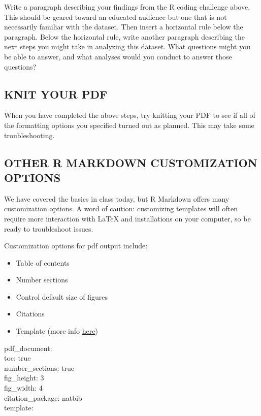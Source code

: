\documentclass[
]{article}
\providecommand{\tightlist}{%
  \setlength{\itemsep}{0pt}\setlength{\parskip}{0pt}}
\begin{document}
Write a paragraph describing your findings from the R coding challenge
above. This should be geared toward an educated audience but one that is
not necessarily familiar with the dataset. Then insert a horizontal rule
below the paragraph. Below the horizontal rule, write another paragraph
describing the next steps you might take in analyzing this dataset. What
questions might you be able to answer, and what analyses would you
conduct to answer those questions?

\hypertarget{knit-your-pdf}{%
\subsection{KNIT YOUR PDF}\label{knit-your-pdf}}

When you have completed the above steps, try knitting your PDF to see if
all of the formatting options you specified turned out as planned. This
may take some troubleshooting.

\hypertarget{other-r-markdown-customization-options}{%
\subsection{OTHER R MARKDOWN CUSTOMIZATION
OPTIONS}\label{other-r-markdown-customization-options}}

We have covered the basics in class today, but R Markdown offers many
customization options. A word of caution: customizing templates will
often require more interaction with LaTeX and installations on your
computer, so be ready to troubleshoot issues.

Customization options for pdf output include:

\begin{itemize}
\tightlist
\item
  Table of contents
\item
  Number sections
\item
  Control default size of figures
\item
  Citations
\item
  Template (more info
  \href{http://jianghao.wang/post/2017-12-08-rmarkdown-templates/}{here})
\end{itemize}

pdf\_document:\\
toc: true\\
number\_sections: true\\
fig\_height: 3\\
fig\_width: 4\\
citation\_package: natbib\\
template:
\end{document}

